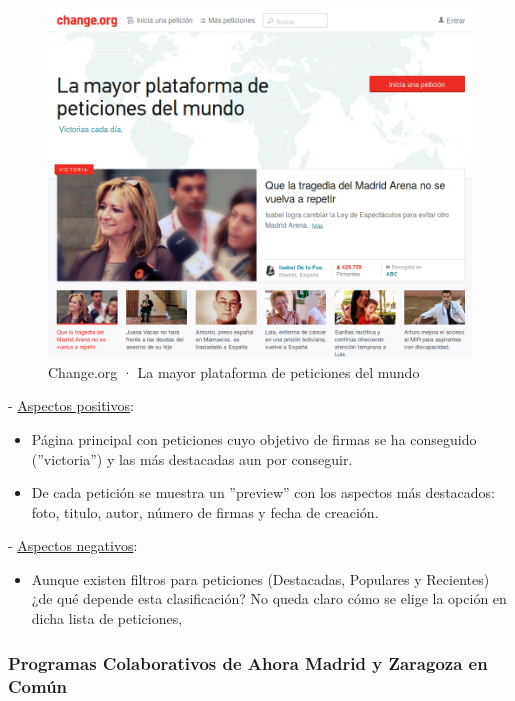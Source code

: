 \begin{figure}[!]
\centering
\includegraphics[keepaspectratio, scale=0.30]{Media/Captures/changeOrg.png}
\caption{Change.org · La mayor plataforma de peticiones del mundo}
\label{fig:changeOrg}
\end{figure}

 - \underline{Aspectos positivos}:

\begin{itemize}
	\item Página principal con peticiones cuyo objetivo de firmas se ha conseguido (''victoria'') y las más destacadas aun por conseguir.
	\item De cada petición se muestra un ''preview'' con los aspectos más destacados: foto, titulo, autor, número de firmas y fecha de creación.
\end{itemize}

 - \underline{Aspectos negativos}:

\begin{itemize}
	\item Aunque existen filtros para peticiones (Destacadas, Populares y Recientes) ¿de qué depende esta clasificación? No queda claro cómo se elige la opción en dicha lista de peticiones,
\end{itemize}

\subsubsection{Programas Colaborativos de Ahora Madrid y Zaragoza en Común}

